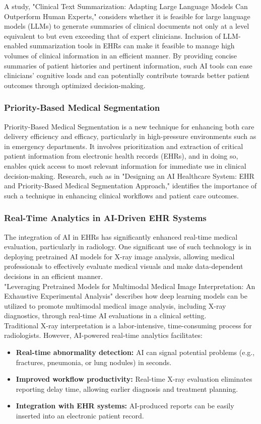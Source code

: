 A study, "Clinical Text Summarization: Adapting Large Language Models Can Outperform Human Experts," considers whether it is feasible for large language models (LLMs) to generate summaries of clinical documents not only at a level equivalent to but even exceeding that of expert clinicians. Inclusion of LLM-enabled summarization tools in EHRs can make it feasible to manage high volumes of clinical information in an efficient manner. By providing concise summaries of patient histories and pertinent information, such AI tools can ease clinicians' cognitive loads and can potentially contribute towards better patient outcomes through optimized decision-making.\cite{Van_Veen2023-cw}
\subsubsection{Priority-Based Medical Segmentation}
Priority-Based Medical Segmentation is a new technique for enhancing both care delivery efficiency and efficacy, particularly in high-pressure environments such as in emergency departments. It involves prioritization and extraction of critical patient information from electronic health records (EHRs), and in doing so, enables quick access to most relevant information for immediate use in clinical decision-making. Research, such as in "Designing an AI Healthcare System: EHR and Priority-Based Medical Segmentation Approach," identifies the importance of such a technique in enhancing clinical workflows and patient care outcomes.\cite{article4}
\subsubsection{Real-Time Analytics in AI-Driven EHR Systems}
The integration of AI in EHRs has significantly enhanced real-time medical evaluation, particularly in radiology. One significant use of such technology is in deploying pretrained AI models for X-ray image analysis, allowing medical professionals to effectively evaluate medical visuals and make data-dependent decisions in an efficient manner.\\
"Leveraging Pretrained Models for Multimodal Medical Image Interpretation: An Exhaustive Experimental Analysis" describes how deep learning models can be utilized to promote multimodal medical image analysis, including X-ray diagnostics, through real-time AI evaluations in a clinical setting.\cite{Fagbola2024.08.09.24311762}\\
Traditional X-ray interpretation is a labor-intensive, time-consuming process for radiologists. However, AI-powered real-time analytics facilitates:
\begin{itemize}
    \item \textbf{Real-time abnormality detection:} AI can signal potential problems (e.g., fractures, pneumonia, or lung nodules) in seconds.
    \item \textbf{Improved workflow productivity:} Real-time X-ray evaluation eliminates reporting delay time, allowing earlier diagnosis and treatment planning.
    \item \textbf{Integration with EHR systems:} AI-produced reports can be easily inserted into an electronic patient record.
\end{itemize}

